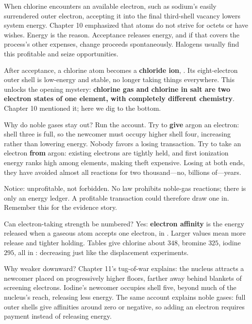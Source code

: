 When chlorine encounters an available electron, such as sodium's easily surrendered outer electron, accepting it into the final third-shell vacancy lowers system energy. Chapter 10 emphasized that atoms do not strive for octets or have wishes. Energy is the reason. Acceptance releases energy, and if that covers the process's other expenses, change proceeds spontaneously. Halogens usually find this profitable and seize opportunities.

After acceptance, a chlorine atom becomes a \textbf{chloride ion}, . Its eight-electron outer shell is low-energy and stable, no longer taking things everywhere. This unlocks the opening mystery: \textbf{chlorine gas and chlorine in salt are two electron states of one element, with completely different chemistry}. Chapter 10 mentioned it; here we dig to the bottom.

Why do noble gases stay out? Run the account. Try to \textbf{give} argon an electron: shell three is full, so the newcomer must occupy higher shell four, increasing rather than lowering energy. Nobody favors a losing transaction. Try to take an electron \textbf{from} argon: existing electrons are tightly held, and first ionization energy ranks high among elements, making theft expensive. Losing at both ends, they have avoided almost all reactions for two thousand---no, billions of---years.

Notice: unprofitable, not forbidden. No law prohibits noble-gas reactions; there is only an energy ledger. A profitable transaction could therefore draw one in. Remember this for the evidence story.

\begin{qiaoliang}
Can electron-taking strength be numbered? Yes: \textbf{electron affinity} is the energy released when a gaseous atom accepts one electron, in . Larger values mean more release and tighter holding. Tables give chlorine about $348$, bromine $325$, iodine $295$, all in : decreasing just like the displacement experiments.

Why weaker downward? Chapter 11's tug-of-war explains: the nucleus attracts a newcomer placed on progressively higher floors, farther away behind blankets of screening electrons. Iodine's newcomer occupies shell five, beyond much of the nucleus's reach, releasing less energy. The same account explains noble gases: full outer shells give affinities around zero or negative, so adding an electron requires payment instead of releasing energy.
\end{qiaoliang}

